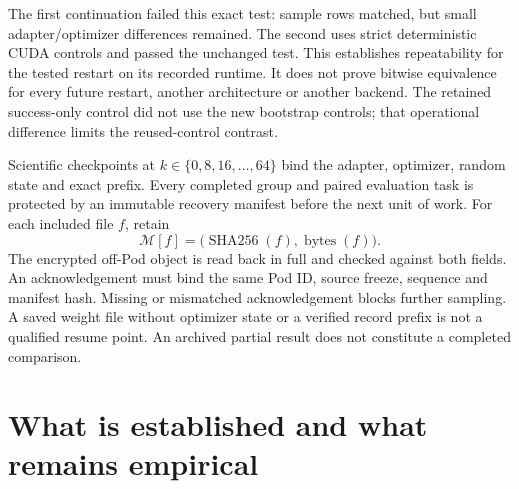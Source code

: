\documentclass[11pt]{article}
\begin{document}
The first continuation failed this exact test: sample rows matched, but small adapter/optimizer differences remained. The second uses strict deterministic CUDA controls and passed the unchanged test. This establishes repeatability for the tested restart on its recorded runtime. It does not prove bitwise equivalence for every future restart, another architecture or another backend. The retained success-only control did not use the new bootstrap controls; that operational difference limits the reused-control contrast.

Scientific checkpoints at $k\in\{0,8,16,\ldots,64\}$ bind the adapter, optimizer, random state and exact prefix. Every completed group and paired evaluation task is protected by an immutable recovery manifest before the next unit of work. For each included file $f$, retain
\begin{equation}
 \mathcal M[f]=\bigl(\operatorname{SHA256}(f),\operatorname{bytes}(f)\bigr).
\end{equation}
The encrypted off-Pod object is read back in full and checked against both fields. An acknowledgement must bind the same Pod ID, source freeze, sequence and manifest hash. Missing or mismatched acknowledgement blocks further sampling. A saved weight file without optimizer state or a verified record prefix is not a qualified resume point. An archived partial result does not constitute a completed comparison.

\section{What is established and what remains empirical}
\end{document}
